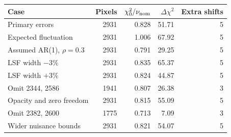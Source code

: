 \begin{tabular}{lrrrr}
\toprule
Case & Pixels & $\chi^2_0/\nu_{\rm nom}$ & $\Delta\chi^2$ & Extra shifts\\
\midrule
Primary errors & 2931 & 0.828 & 51.71 & 5\\
Expected fluctuation & 2931 & 1.006 & 67.92 & 5\\
Assumed AR(1), $\rho=0.3$ & 2931 & 0.791 & 29.25 & 5\\
LSF width $-3\%$ & 2931 & 0.835 & 65.37 & 5\\
LSF width $+3\%$ & 2931 & 0.824 & 44.87 & 5\\
Omit 2344, 2586 & 1941 & 0.807 & 26.38 & 3\\
Opacity and zero freedom & 2931 & 0.815 & 55.09 & 5\\
Omit 2382, 2600 & 1775 & 0.713 & 7.09 & 3\\
Wider nuisance bounds & 2931 & 0.821 & 54.07 & 5\\
\bottomrule
\end{tabular}

